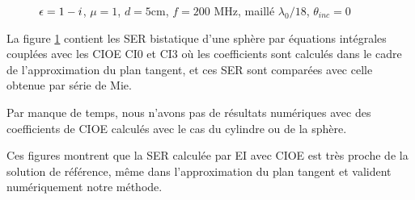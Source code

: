   \FloatBarrier

  \begin{figure}[!hbt]
    \centering
    
    \caption{\(\epsilon = 1 - i\), \(\mu = 1\), \(d = 5\)cm, \( f =  200\) MHz, maillé \(\lambda_0/18\), \(\theta_{inc}=0\)}
    \label{fig:ser:sphere-bis-M1}
  \end{figure}

  La figure \ref{fig:ser:sphere-bis-M1} contient les SER bistatique d'une sphère par équations intégrales couplées avec les CIOE CI0 et CI3 où les coefficients sont calculés dans le cadre de l'approximation du plan tangent, et ces SER sont comparées avec celle obtenue par série de Mie.

  Par manque de temps, nous n'avons pas de résultats numériques avec des coefficients de CIOE calculés avec le cas du cylindre ou de la sphère.

  Ces figures montrent que la SER calculée par EI avec CIOE est très proche de la solution de référence, même dans l'approximation du plan tangent et valident numériquement notre méthode.

  \FloatBarrier